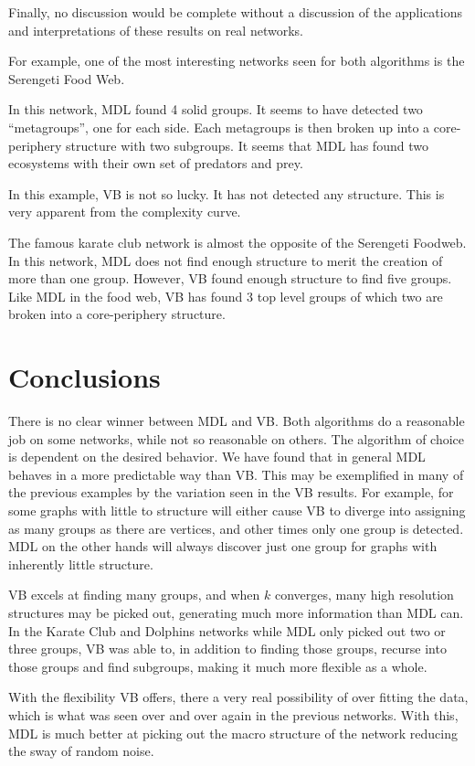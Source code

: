 Finally, no discussion would be complete without a discussion of
the applications and interpretations of these results on real networks.

For example, one of the most interesting networks seen for both algorithms
is the Serengeti Food Web.


In this network, MDL found 4 solid groups. It seems to have detected
two ``metagroups'', one for each side. Each metagroups is then broken up
into a core-periphery structure with two subgroups. It seems that MDL
has found two ecosystems with their own set of predators and prey.

In this example, VB is not so lucky. It has not detected any structure. This
is very apparent from the complexity curve.



The famous karate club network is almost the opposite of the Serengeti
Foodweb. In this network, MDL does not find enough structure to merit the
creation of more than one group. However, VB found enough structure to
find five groups. Like MDL in the food web, VB has found 3 top level groups
of which two are broken into a core-periphery structure.


\section*{Conclusions}

There is no clear winner between MDL and VB. Both algorithms do a reasonable
job on some networks, while not so reasonable on others. The algorithm
of choice is dependent on the desired behavior. We have found that in general
MDL behaves in a more predictable way than VB. This may be exemplified in many of
the previous examples by the variation seen in the VB results. For example, for
some graphs with little to structure will either cause VB to diverge
into assigning as many groups as there are vertices, and other times only
one group is detected. MDL on the other hands will always discover just one
group for graphs with inherently little structure.

VB excels at finding many groups, and when $k$ converges, many
high resolution structures may be picked out, generating much more
information than MDL can. In the Karate Club and Dolphins networks
while MDL only picked out two or three groups, VB was able to, in
addition to finding those groups, recurse into those groups and find
subgroups, making it much more flexible as a whole.

With the flexibility VB offers, there a very real possibility of over fitting
the data, which is what was seen over and over again in the previous networks.
With this, MDL is much better at picking out the macro structure of the network
reducing the sway of random noise.



